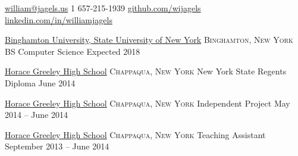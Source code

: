 \documentclass[11pt]{article}
\begin{document}
\sloppy  %



\nobreakvspace{0.3em}  %

\noindent\href{mailto:william@jagels.us}{william\mbox{}@\mbox{}jagels.us}\sbull
\textsmaller{+}1 657-215-1939\sbull
\href{https://github.com/wijagels}{github.com/wijagels}\sbull
\href{https://www.linkedin.com/in/williamjagels}{linkedin.com/in/williamjagels}





\spacedhrule{0.1em}{0.4em}  %

\headedsection
  {\href{http://www.binghamton.edu/index.php}{Binghamton University, State University of New York}}
  {\textsc{Binghamton, New York}} {
  \headedsubsection
    {BS Computer Science}
    {Expected 2018}
    {}
}

\headedsection
  {\href{http://hg.ccsd.ws/}{Horace Greeley High School}}
  {\textsc{Chappaqua, New York}} {
  \headedsubsection
    {New York State Regents Diploma}
    {June 2014}
    {}
}


\spacedhrule{0.1em}{0.4em}  %

\vspace{0.5em}
\headedsection  %
  {\href{http://hg.ccsd.ws/}{Horace Greeley High School}}
  {\textsc{Chappaqua, New York}} {
  \headedsubsection
    {Independent Project}
    {May 2014 -- June 2014}
    {}
}

\vspace{0.5em}
\headedsection  %
  {\href{http://hg.ccsd.ws/}{Horace Greeley High School}}
  {\textsc{Chappaqua, New York}} {
  \headedsubsection
    {Teaching Assistant}
    {September 2013 -- June 2014}
    {}
}
\end{document}
